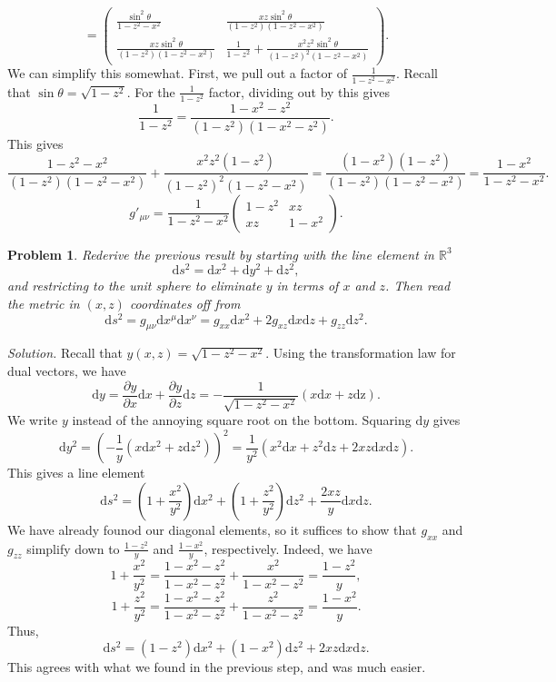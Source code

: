 \documentclass[11pt, letterpaper]{article}
\theoremstyle{plain}
\newtheorem{problem}{Problem}[section]
\begin{document}
\[
	=\begin{pmatrix}
		\displaystyle{\frac{\sin ^2\theta }{1-z^2-x^2} } & \displaystyle{\frac{xz \sin ^2\theta }{\left( 1-z^2 \right) \left( 1-z^2-x^2 \right) }}  \\
			\displaystyle{\frac{xz \sin ^2\theta }{\left( 1-z^2 \right) \left( 1-z^2-x^2 \right) }} & \displaystyle{\frac{1}{1-z^2} +\frac{x^2z^2 \sin ^2\theta }{\left( 1-z^2 \right) ^2\left( 1-z^2-x^2 \right) } }
	\end{pmatrix}
.\]
We can simplify this somewhat. First, we pull out a factor of $\frac{1}{1-z^2-x^2}$. Recall that $\sin \theta =\sqrt{1-z^2} $. For the $\frac{1}{1-z^2} $ factor, dividing out by this gives
\[
	\frac{1}{1-z^2} =\frac{1-x^2-z^2}{\left( 1-z^2 \right) \left( 1-x^2-z^2 \right) }
.\]
This gives
\[
	\frac{1-z^2-x^2}{(1-z^2)\left( 1-z^2-x^2 \right) } +\frac{x^2z^2 \left( 1-z^2 \right) }{\left( 1-z^2 \right) ^2\left( 1-z^2-x^2 \right) } =\frac{\left( 1-x^2 \right) \left( 1-z^2 \right) }{\left( 1-z^2 \right) \left( 1-z^2-x^2 \right) } =\frac{1-x^2}{1-z^2-x^2} 
.\]
\[
	g'_{\mu \nu } =\frac{1}{1-z^2-x^2} \begin{pmatrix}
		1-z^2 & xz\\
		xz & 1-x^2
	\end{pmatrix}
.\]
\begin{problem}
	Rederive the previous result by starting with the line element in $\mathbb{R} ^3$
	\[
		\mathrm{d} s^2=\mathrm{d} x^2+\mathrm{d} y^2+\mathrm{d} z^2
	,\]
	and restricting to the unit sphere to eliminate $y$ in terms of $x$ and $z$. Then read the metric in $(x,z)$ coordinates off from
	\[
		\mathrm{d} s^2=g_{\mu \nu } \mathrm{d} x^\mu \mathrm{d} x^\nu =g_{xx} \mathrm{d} x^2+2g_{xz} \mathrm{d} x\mathrm{d} z+g_{zz} \mathrm{d} z^2
	.\]
\end{problem}
\noindent \emph{Solution.} Recall that $y(x,z)=\sqrt{1-z^2-x^2} $. Using the transformation law for dual vectors, we have
\[
	\mathrm{d} y=\frac{\partial y}{\partial x} \mathrm{d} x+\frac{\partial y}{\partial z} \mathrm{d} z=-\frac{1}{\sqrt{1-z^2-x^2} } \left( x \mathrm{d} x+z \mathrm{dz}  \right) 
.\]
We write $y$ instead of the annoying square root on the bottom. Squaring $\mathrm{d} y$ gives
\[
	\mathrm{d} y^2=\left( -\frac{1}{y} \left( x\mathrm{d} x^2+z\mathrm{d} z^2 \right)  \right) ^2=\frac{1}{y^2} \left( x^2\mathrm{d} x+z^2\mathrm{d} z+2xz\mathrm{d} x\mathrm{d} z \right) 
.\]
This gives a line element
\[
	\mathrm{d} s^2=\left( 1+\frac{x^2}{y^2}  \right) \mathrm{d} x^2+\left( 1+\frac{z^2}{y^2}  \right) \mathrm{d} z^2+\frac{2xz}{y} \mathrm{d} x\mathrm{d} z
.\]
We have already founod our diagonal elements, so it suffices to show that $g_{xx} $ and $g_{zz} $ simplify down to $\frac{1-z^2}{y}$ and $\frac{1-x^2}{y} $, respectively. Indeed, we have
\[
	1+\frac{x^2}{y^2} =\frac{1-x^2-z^2}{1-x^2-z^2} +\frac{x^2}{1-x^2-z^2} =\frac{1-z^2}{y} ,
\]
\[
	1+\frac{z^2}{y^2} =\frac{1-x^2-z^2}{1-x^2-z^2} +\frac{z^2}{1-x^2-z^2} =\frac{1-x^2}{y} 
.\]
Thus,
\[
	\mathrm{d} s^2=\left( 1-z^2 \right) \mathrm{d} x^2+\left( 1-x^2 \right) \mathrm{d} z^2+2xz\mathrm{d} x\mathrm{d} z
.\]
This agrees with what we found in the previous step, and was much easier.
\end{document}
